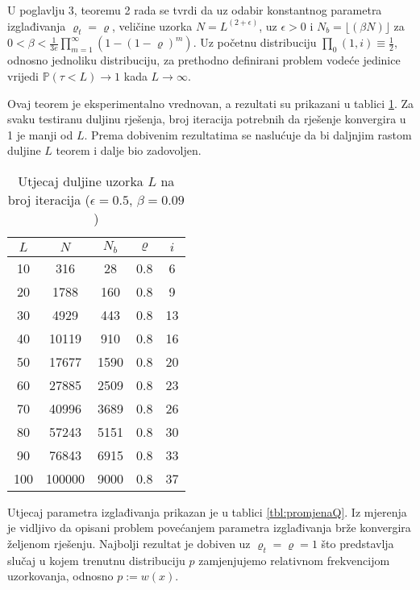 \documentclass[times, utf8, zavrsni]{fer}
\newcommand{\floor}[1]{\lfloor #1 \rfloor}
\begin{document}
U poglavlju 3, teoremu 2 rada \cite{DBLP:journals/tec/WuK14} se tvrdi da uz odabir konstantnog parametra izglađivanja $\varrho_t = \varrho$, veličine uzorka $N = L^{(2 + \epsilon)}$, uz $\epsilon > 0$ i
$N_b =  \floor{(\beta N)}$ za $0 < \beta < \frac{1}{3e} \prod^{\infty}_{m=1} (1 - (1 - \varrho)^m)$. Uz početnu distribuciju
$\prod_0(1, i) \equiv \frac{1}{2}$, odnosno jednoliku distribuciju, za prethodno definirani
problem vodeće jedinice vrijedi $\mathbb{P}(\tau < L) \rightarrow 1$ kada $L \rightarrow \infty$.

Ovaj teorem je eksperimentalno vrednovan, a rezultati su prikazani u tablici \ref{tbl:promjenaL}.
Za svaku testiranu duljinu rješenja, broj iteracija potrebnih da rješenje konvergira u 1 je manji od $L$.
Prema dobivenim rezultatima se naslućuje da bi daljnjim rastom duljine $L$
teorem i dalje bio zadovoljen.
\begin{table}[h!]
  \caption{Utjecaj duljine uzorka $L$ na broj iteracija ($\epsilon = 0.5$, $\beta = 0.09$)}
  \label{tbl:promjenaL}
  \centering
  \begin{tabular}{c | c | c | c | c}
    $L$ & $N$ & $N_b$ & $\varrho$ & $i$ \\ \hline
    10 & 316 & 28 & 0.8 & 6 \\ \hline
    20 & 1788 & 160 & 0.8 & 9 \\ \hline
    30 & 4929 & 443 & 0.8 & 13 \\ \hline
    40 & 10119 & 910 & 0.8 & 16 \\ \hline
    50 & 17677 & 1590 & 0.8 & 20 \\ \hline
    60 & 27885 & 2509 & 0.8 & 23 \\ \hline
    70 & 40996 & 3689 & 0.8 & 26 \\ \hline
    80 & 57243 & 5151 & 0.8 & 30 \\ \hline
    90 & 76843 & 6915 & 0.8 & 33 \\ \hline
    100 & 100000 & 9000 & 0.8 & 37
  \end{tabular}
\end{table}



Utjecaj parametra izglađivanja prikazan je u tablici \ref{tbl:promjenaQ}. Iz mjerenja je vidljivo da opisani problem povećanjem parametra izglađivanja
brže konvergira željenom rješenju. Najbolji rezultat je dobiven uz $\varrho_t = \varrho = 1$ što predstavlja slučaj u kojem trenutnu distribuciju
$p$ zamjenjujemo relativnom frekvencijom uzorkovanja, odnosno $p := w(x)$.
\end{document}
